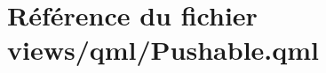 \hypertarget{Pushable_8qml}{\section{Référence du fichier views/qml/\-Pushable.qml}
\label{Pushable_8qml}
}
